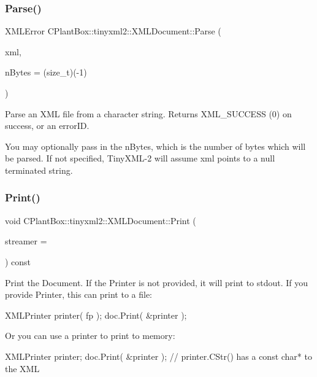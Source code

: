 \subsubsection{\texorpdfstring{Parse()}{Parse()}}
{\footnotesize\ttfamily X\+M\+L\+Error C\+Plant\+Box\+::tinyxml2\+::\+X\+M\+L\+Document\+::\+Parse (\begin{DoxyParamCaption}\item[{const char $\ast$}]{xml,  }\item[{size\+\_\+t}]{n\+Bytes = {\ttfamily (size\+\_\+t)(-\/1)} }\end{DoxyParamCaption})}

Parse an X\+ML file from a character string. Returns X\+M\+L\+\_\+\+S\+U\+C\+C\+E\+SS (0) on success, or an error\+ID.

You may optionally pass in the \textquotesingle{}n\+Bytes\textquotesingle{}, which is the number of bytes which will be parsed. If not specified, Tiny\+X\+M\+L-\/2 will assume \textquotesingle{}xml\textquotesingle{} points to a null terminated string. \mbox{\label{classCPlantBox_1_1tinyxml2_1_1XMLDocument_a306348e6959e42c2e1a995959b7d0847}} 
\subsubsection{\texorpdfstring{Print()}{Print()}}
{\footnotesize\ttfamily void C\+Plant\+Box\+::tinyxml2\+::\+X\+M\+L\+Document\+::\+Print (\begin{DoxyParamCaption}\item[{\hyperlink{classCPlantBox_1_1tinyxml2_1_1XMLPrinter}{X\+M\+L\+Printer} $\ast$}]{streamer = {} }\end{DoxyParamCaption}) const}

Print the Document. If the Printer is not provided, it will print to stdout. If you provide Printer, this can print to a file\+: \begin{DoxyVerb}XMLPrinter printer( fp );
doc.Print( &printer );
\end{DoxyVerb}


Or you can use a printer to print to memory\+: \begin{DoxyVerb}XMLPrinter printer;
doc.Print( &printer );
// printer.CStr() has a const char* to the XML
\end{DoxyVerb}
 \mbox{\label{classCPlantBox_1_1tinyxml2_1_1XMLDocument_af2c2522e70ac7a16d3df80847035cf17}} 
